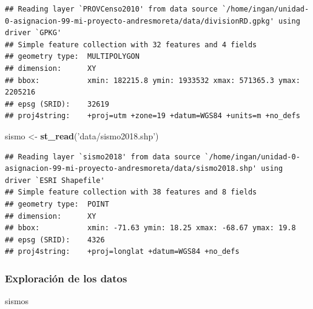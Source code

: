 \documentclass[11pt,]{article}
\newenvironment{Shaded}{\begin{snugshade}}{\end{snugshade}}
\newcommand{\KeywordTok}[1]{\textcolor[rgb]{0.13,0.29,0.53}{\textbf{#1}}}
\newcommand{\StringTok}[1]{\textcolor[rgb]{0.31,0.60,0.02}{#1}}
\newcommand{\NormalTok}[1]{#1}
\begin{document}
\begin{verbatim}
## Reading layer `PROVCenso2010' from data source `/home/ingan/unidad-0-asignacion-99-mi-proyecto-andresmoreta/data/divisionRD.gpkg' using driver `GPKG'
## Simple feature collection with 32 features and 4 fields
## geometry type:  MULTIPOLYGON
## dimension:      XY
## bbox:           xmin: 182215.8 ymin: 1933532 xmax: 571365.3 ymax: 2205216
## epsg (SRID):    32619
## proj4string:    +proj=utm +zone=19 +datum=WGS84 +units=m +no_defs
\end{verbatim}

\begin{Shaded}
\begin{Highlighting}[]
\NormalTok{sismo <-}\StringTok{ }\KeywordTok{st_read}\NormalTok{(}\StringTok{'data/sismo2018.shp'}\NormalTok{)}
\end{Highlighting}
\end{Shaded}

\begin{verbatim}
## Reading layer `sismo2018' from data source `/home/ingan/unidad-0-asignacion-99-mi-proyecto-andresmoreta/data/sismo2018.shp' using driver `ESRI Shapefile'
## Simple feature collection with 38 features and 8 fields
## geometry type:  POINT
## dimension:      XY
## bbox:           xmin: -71.63 ymin: 18.25 xmax: -68.67 ymax: 19.8
## epsg (SRID):    4326
## proj4string:    +proj=longlat +datum=WGS84 +no_defs
\end{verbatim}

\subsubsection{Exploración de los
datos}\label{exploraciuxf3n-de-los-datos}

\begin{Shaded}
\begin{Highlighting}[]
\NormalTok{sismos}
\end{Highlighting}
\end{Shaded}
\end{document}
